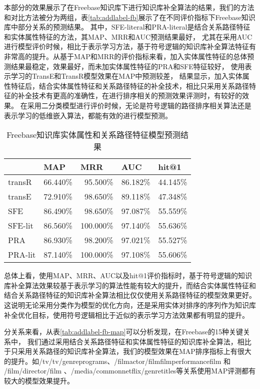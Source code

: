 本部分的效果展示了在Freebase知识库下进行知识库补全算法的结果，我们的方法和对比方法被分为两组，表\ref{tab:addlabel-fb}展示了在不同评价指标下Freebase知识库中部分关系的预测结果。
其中，SFE-literal和PRA-literal是结合关系路径特征和实体属性特征的方法，其MAP、MRR和AUC预测结果最好，
尤其在采用AUC进行模型评价时候，相比于表示学习方法，基于符号逻辑的知识库补全算法特征有非常高的提升。从基于MAP和MRR的评价指标来看，加入实体属性特征的总体预测结果最稳定，效果最好，而未加实体属性特征的PRA和SFE特征较好，
使用表示学习的TransE和TransR模型效果在MAP中预测较差，
结果显示，加入实体属性特征后，结合实体属性特征和关系路径特征的补全技术，相比只采用关系路径特征的补全技术有更高的准确性，在进行排序相关的预测效果评测时，有较好的效果。
在采用二分类模型进行评价时候，无论是符号逻辑的路径排序相关算法还是表示学习的低维嵌入算法，都能有效的进行模型预测。

\begin{table}[htbp]
  \centering
  \caption{Freebase知识库实体属性和关系路径特征模型预测结果}
    \begin{tabular}{|l|r|r|r|r|}
    \hline
          & \multicolumn{1}{l|}{MAP} & \multicolumn{1}{l|}{MRR} & \multicolumn{1}{l|}{AUC} & \multicolumn{1}{l|}{hit@1} \\
    \hline
    transR & 66.440\% & 95.500\% & 86.182\% & 44.145\% \\
    \hline
    transE & 72.910\% & 98.650\% & 89.118\% & 47.348\% \\
    \hline
    SFE   & 86.490\% & 98.650\% & 97.087\% & 55.559\% \\
    \hline
    SFE-lit & 86.560\% & 100.000\% & 97.140\% & 55.636\% \\
    \hline
    PRA   & 86.930\% & 98.200\% & 97.021\% & 55.527\% \\
    \hline
    PRA-lit & 87.140\% & 100.000\% & 97.108\% & 55.606\% \\
    \hline
    \end{tabular}%
  \label{tab:addlabel}%
\end{table}%

总体上看，使用MAP、MRR、AUC以及hit@1评价指标时，基于符号逻辑的知识库补全算法效果较基于表示学习的算法性能有较大的提升，而结合实体属性特征和结合关系路径特征的知识库补全算法相比仅仅使用关系路径特征的模型效果更好。这说明无论采用分类作为模型的优化方向，还是采用实体对排序的序列作为知识库补全优化目标，使用符号逻辑相比于近似的表示学习方法效果都有明显的提升。


分关系来看，从表\ref{tab:addlabel-fb-map}可以分析发现，在Freebase的15种关键关系中，
我们通过采用结合关系路径特征和实体属性特征的知识库补全算法，相比于只采用关系路径的知识库补全算法，我们的模型效果在MAP排序指标上有很大的提升。如/tv/tv/genreprograms、/filmactor/filmfilmperformancefilm 和 /film/director/film 、/media/commonnetflix/genretitles等关系使用MAP评测都有较大的模型效果提升。


